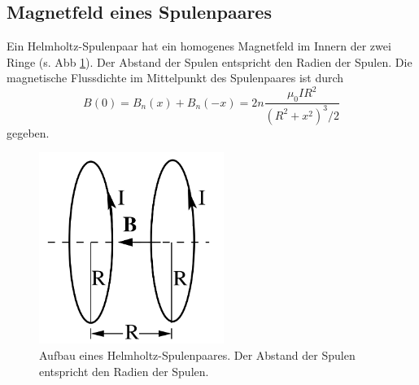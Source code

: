 \subsection{Magnetfeld eines Spulenpaares}
Ein Helmholtz-Spulenpaar hat ein homogenes Magnetfeld im Innern der zwei Ringe %
(s. Abb \ref{fig:helmholtz}). Der Abstand der Spulen entspricht den Radien der
Spulen.
Die magnetische Flussdichte im Mittelpunkt des Spulenpaares ist durch 
\begin{equation}
B(0)= B_{n}(x) + B_{n}(-x) = 2n \frac{\mu_{0} I R^2}{(R^2 + x^2)^3/2} %
\end{equation}
gegeben.
\begin{figure}
    \centering
    \includegraphics[width=6cm,hight=8cm]{build/Helmholtz.png}
    \caption{Aufbau eines Helmholtz-Spulenpaares. Der Abstand der Spulen
    entspricht den Radien der Spulen.}
    \label{fig:helmholtz}
\end{figure}

